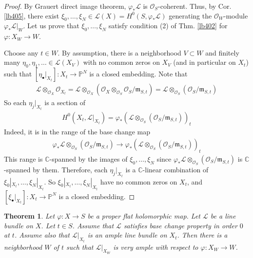 \documentclass[12pt,b5paper,notitlepage]{report}
\theoremstyle{definition}
\theoremstyle{plain}
\newtheorem{thm}[df]{Theorem}
\newcommand{\scr}{\mathscr}
\newcommand{\blt}{\bullet}
\newcommand{\Cbb}{\mathbb C}
\newcommand{\Pbb}{\mathbb P}
\newcommand{\mk}{\mathfrak m}
\numberwithin{equation}{section}
\begin{document}
\begin{proof}
By Grauert direct image theorem, $\varphi_*\scr L$ is $\scr O_S$-coherent. Thus, by Cor. \ref{lb405}, there exist $\xi_0,\dots,\xi_N\in\scr L(X)=H^0(S,\varphi_*\scr L)$ generating the $\scr O_W$-module $\varphi_*\scr L|_W$. Let us prove that $\xi_0,\dots,\xi_N$ satisfy condition (2) of Thm. \ref{lb402} for $\varphi:X_W\rightarrow W$.

Choose any $t\in W$. By assumption, there is a neighborhood $V\subset W$ and finitely many $\eta_0,\eta_1,\dots\in\scr L(X_V)$ with no common zeros on $X_V$ (and in particular on $X_t$) such that $[\eta_\blt|_{X_t}]:X_t\rightarrow\Pbb^N$ is a closed embedding. Note that 
\begin{align}
\scr L\otimes_{\scr O_X}\scr O_{X_t}=\scr L\otimes_{\scr O_X}(\scr O_X\otimes_{\scr O_S}\scr O_S/\mk_{S,t})=\scr L\otimes_{\scr O_S}(\scr O_S/\mk_{S,t})
\end{align}
So each $\eta_j|_{X_t}$ is a section of 
\begin{align}\label{eq210}
H^0(X_t,\scr L|_{X_t})=\varphi_*(\scr L\otimes_{\scr O_S}(\scr O_S/\mk_{S,t}))_t
\end{align}
Indeed, it is in the range of the base change map
\begin{align}\label{eq211}
\varphi_*\scr L\otimes_{\scr O_S}(\scr O_S/\mk_{S,t})\rightarrow \varphi_*(\scr L\otimes_{\scr O_S}(\scr O_S/\mk_{S,t}))_t
\end{align}
This range is $\Cbb$-spanned by the images of $\xi_0,\dots,\xi_N$ since $\varphi_*\scr L\otimes_{\scr O_S}(\scr O_S/\mk_{S,t})$ is $\Cbb$-spanned by them. Therefore, each $\eta_j|_{X_t}$ is a $\Cbb$-linear combination of $\xi_0|_{X_t},\dots,\xi_N|_{X_t}$. So $\xi_0|_{X_t},\dots,\xi_N|_{X_t}$ have no common zeros on $X_t$, and $[\xi_\blt|_{X_t}]:X_t\rightarrow\Pbb^N$ is a closed embedding.
\end{proof}






\begin{thm}\label{lb404}
Let $\varphi:X\rightarrow S$ be a proper flat holomorphic map. Let $\scr L$ be a line bundle on $X$. Let $t\in S$. Assume that $\scr L$ satisfies base change property in order $0$ at $t$. Assume also that $\scr L|_{X_t}$ is an ample line bundle on $X_t$. Then there is a neighborhood $W$ of $t$ such that $\scr L|_{X_W}$ is very ample with respect to $\varphi:X_W\rightarrow W$.
\end{thm}
\end{document}
